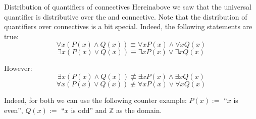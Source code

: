\documentclass{article}
\begin{document}
\begin{parag}{Distribution of quantifiers of connectives}
    Hereinabove we saw that the universal quantifier is distributive over the and connective. Note that the distribution of quantifiers over connectives is a bit special. Indeed, the following statements are true: 
    \[\forall x\left(P\left(x\right) \land Q\left(x\right)\right) \equiv \forall x P\left(x\right) \land \forall x Q\left(x\right)\]
    \[\exists x \left(P\left(x\right) \lor Q\left(x\right)\right) \equiv \exists x P\left(x\right) \lor \exists x Q\left(x\right)\]

    However:
    \[\exists x\left(P\left(x\right) \land Q\left(x\right)\right) \not\equiv \exists x P\left(x\right) \land \exists x Q\left(x\right)\]
    \[\forall x \left(P\left(x\right) \lor Q\left(x\right)\right) \not\equiv \forall x P\left(x\right) \lor \forall x Q\left(x\right)\]

    Indeed, for both we can use the following counter example: $P\left(x\right) := $ ``$x$ is even'', $Q\left(x\right) := $ ``$x$ is odd'' and $\mathbb{Z}$ as the domain.

\end{parag}
\end{document}
